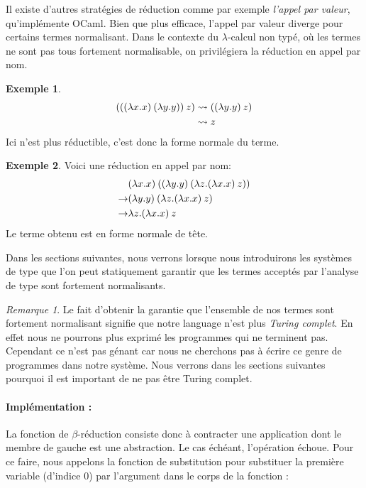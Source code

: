 \documentclass {article}
\newcommand{\codefrom}[3]
           {}
\theoremstyle{definition}
\newtheorem{example}{Exemple}
\theoremstyle{remark}
\newtheorem{remark}{Remarque}
\begin{document}
Il existe d'autres stratégies de réduction comme par exemple
\emph{l'appel par valeur}, qu'implémente OCaml. Bien que plus
efficace, l'appel par valeur diverge pour certains termes normalisant.
Dans le contexte du \(\lambda\)-calcul non typé, où les termes ne sont
pas tous fortement normalisable, on privilégiera la réduction en appel
par nom.

\begin{example}
  \begin{align*}
    (((\lambda x. x)\:(\lambda y. y))\:z) & \leadsto ((\lambda y. y)\:z) \\    
    & \leadsto z
  \end{align*}
  Ici  n'est plus réductible, c'est donc la forme normale du terme.
\end{example}


\begin{example}
  Voici une réduction en appel par nom:
  \begin{align*}
    & (\lambda x. x)\:({(\lambda y. y)\:({\lambda z. (\lambda x. x)\:z}})) \\
    \rightarrow & (\lambda y. y)\:({\lambda z. (\lambda x. x)\:z})\\
    \rightarrow & \lambda z. (\lambda x. x)\:z
  \end{align*}
  Le terme obtenu est en forme normale de tête.
\end{example}

Dans les sections suivantes, nous verrons lorsque nous introduirons
les systèmes de type que l'on peut statiquement garantir que les
termes acceptés par l'analyse de type sont fortement normalisants.

\begin{remark}
  Le fait d'obtenir la garantie que l'ensemble de nos termes sont fortement normalisant signifie que
  notre language n'est plus \emph{Turing complet}. En effet nous ne pourrons plus exprimé les programmes
  qui ne terminent pas. Cependant ce n'est pas génant car nous ne cherchons pas à écrire ce genre de
  programmes dans notre système. Nous verrons dans les sections suivantes pourquoi il est important
  de ne pas être Turing complet.
\end{remark}




\paragraph{Implémentation :}
La fonction de $\beta$-réduction consiste donc à contracter une
application dont le membre de gauche est une abstraction. Le cas
échéant, l'opération échoue. Pour ce faire, nous appelons la fonction
de substitution pour substituer la première variable (d'indice \(0\))
par l'argument dans le corps de la fonction :
%
\codefrom{untyped}{lambda}{reduction}
\end{document}
